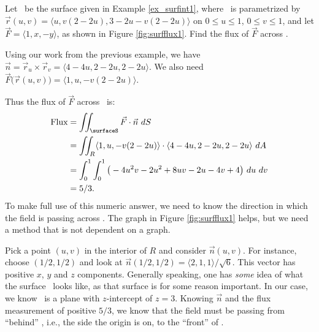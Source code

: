 {Let \surfaceS\ be the surface given in Example \ref{ex_surfint1}, where \surfaceS\ is parametrized by $\vec r(u,v) = \langle u, v(2-2u),3-2u-v(2-2u)\rangle$ on $0\leq u\leq 1$, $0\leq v\leq 1$, and let $\vec F = \langle 1, x,-y\rangle$, as shown in Figure \ref{fig:surfflux1}. Find the flux of $\vec F$ across \surfaceS.
}
{Using our work from the previous example, we have $\vec n = \vec r_u\times\vec r_v = \langle 4-4u,2-2u,2-2u\rangle$. We also need $\vec F\big(\vec r(u,v)\big) = \langle 1, u, -v(2-2u)\rangle$. 

Thus the flux of $\vec F$ across \surfaceS\ is:
\begin{align*}
\text{Flux} &= \iint_\surfaceS \vec F\cdot \vec n\ dS\\
			&= \iint_R \langle 1,u,-v(2-2u)\rangle\cdot\langle 4-4u,2-2u,2-2u\rangle\ dA \\
			&= \int_0^1\int_0^1 \big(-4u^2v-2u^2+8uv-2u-4v+4\big)\ du\ dv\\
			&= 5/3.
\end{align*}
To make full use of this numeric answer, we need to know the direction in which the field is passing across \surfaceS. The graph in Figure \ref{fig:surfflux1} helps, but we need a method that is not dependent on a graph.

Pick a point $(u,v)$ in the interior of $R$ and consider $\vec n(u,v)$. For instance, choose $(1/2,1/2)$ and look at $\vec n(1/2,1/2) = \langle 2,1,1\rangle/\sqrt{6}$. This vector has positive $x$, $y$ and $z$ components. Generally speaking, one has \emph{some} idea of what the surface \surfaceS\ looks like, as that surface is for some reason important. In our case, we know \surfaceS\ is a plane with $z$-intercept of $z=3$. Knowing $\vec n$ and the flux measurement of positive $5/3$, we know that the field must be passing from ``behind'' \surfaceS, i.e., the side the origin is on, to the ``front'' of \surfaceS.
}\\

